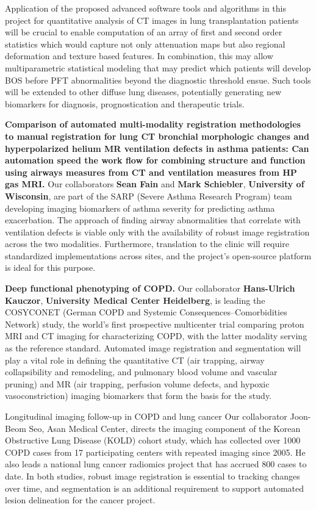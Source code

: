 \documentclass[11pt,]{article}
\begin{document}
Application of the proposed advanced software tools and algorithms in
this project for quantitative analysis of CT images in lung
transplantation patients will be crucial to enable computation of an
array of first and second order statistics which would capture not only
attenuation maps but also regional deformation and texture based
features. In combination, this may allow multiparametric statistical
modeling that may predict which patients will develop BOS before PFT
abnormalities beyond the diagnostic threshold ensue. Such tools will be
extended to other diffuse lung diseases, potentially generating new
biomarkers for diagnosis, prognostication and therapeutic trials.

\textbf{Comparison of automated multi-modality registration
methodologies to manual registration for lung CT bronchial morphologic
changes and hyperpolarized helium MR ventilation defects in asthma
patients: Can automation speed the work flow for combining structure and
function using airways measures from CT and ventilation measures from HP
gas MRI.} Our collaborators \textbf{Sean Fain} and \textbf{Mark
Schiebler}, \textbf{University of Wisconsin}, are part of the SARP
(Severe Asthma Research Program) team developing imaging biomarkers of
asthma severity for predicting asthma exacerbation. The approach of
finding airway abnormalities that correlate with ventilation defects is
viable only with the availability of robust image registration across
the two modalities. Furthermore, translation to the clinic will require
standardized implementations across sites, and the project's open-source
platform is ideal for this purpose.

\textbf{Deep functional phenotyping of COPD.} Our collaborator
\textbf{Hans-Ulrich Kauczor}, \textbf{University Medical Center
Heidelberg}, is leading the COSYCONET (German COPD and Systemic
Consequences--Comorbidities Network) study, the world's first
prospective multicenter trial comparing proton MRI and CT imaging for
characterizing COPD, with the latter modality serving as the reference
standard. Automated image registration and segmentation will play a
vital role in defining the quantitative CT (air trapping, airway
collapsibility and remodeling, and pulmonary blood volume and vascular
pruning) and MR (air trapping, perfusion volume defects, and hypoxic
vasoconstriction) imaging biomarkers that form the basis for the study.

Longitudinal imaging follow-up in COPD and lung cancer Our collaborator
Joon-Beom Seo, Asan Medical Center, directs the imaging component of the
Korean Obstructive Lung Disease (KOLD) cohort study, which has collected
over 1000 COPD cases from 17 participating centers with repeated imaging
since 2005. He also leads a national lung cancer radiomics project that
has accrued 800 cases to date. In both studies, robust image
registration is essential to tracking changes over time, and
segmentation is an additional requirement to support automated lesion
delineation for the cancer project.
\end{document}
